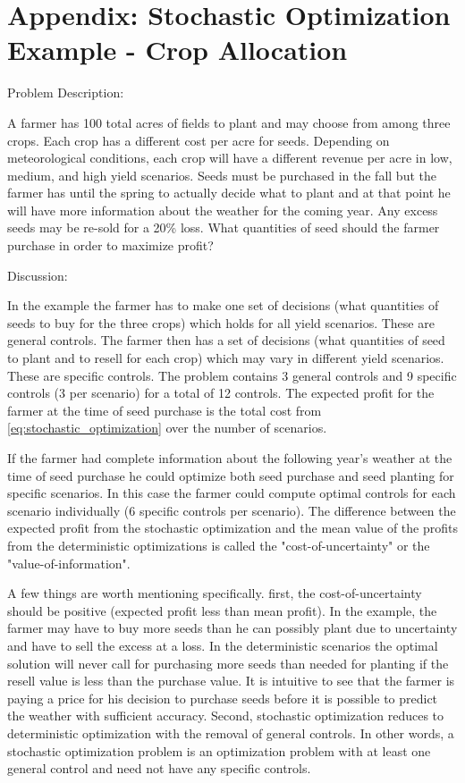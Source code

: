 \section{Appendix: Stochastic Optimization Example - Crop Allocation}

\noindent Problem Description:

\medskip

A farmer has 100 total acres of fields to plant and may choose from among three crops. Each crop has a different cost per acre for seeds. Depending on meteorological conditions, each crop will have a different revenue per acre in  low, medium, and high yield scenarios. Seeds must be purchased in the fall but the farmer has until the spring to actually decide what to plant and at that point he will have more information about the weather for the coming year. Any excess seeds may be re-sold for a 20\% loss. What quantities of seed should the farmer purchase in order to maximize profit?

\medskip

\noindent Discussion:

\medskip

In the example the farmer has to make one set of decisions (what quantities of seeds to buy for the three crops) which holds for all yield scenarios. These are general controls. The farmer then has a set of decisions (what quantities of seed to plant and to resell for each crop) which may vary in different yield scenarios. These are specific controls. The problem contains 3 general controls and 9 specific controls (3 per scenario) for a total of 12 controls. The expected profit for the farmer at the time of seed purchase is the total cost from \eqref{eq:stochastic_optimization} over the number of scenarios.

If the farmer had complete information about the following year's weather at the time of seed purchase he could optimize both seed purchase and seed planting for specific scenarios. In this case the farmer could compute optimal controls for each scenario individually (6 specific controls per scenario). The difference between the expected profit from the stochastic optimization and the mean value of the profits from the deterministic optimizations is called the "cost-of-uncertainty" or the "value-of-information".

A few things are worth mentioning specifically. first, the cost-of-uncertainty should be positive (expected profit less than mean profit). In the example, the farmer may have to buy more seeds than he can possibly plant due to uncertainty and have to sell the excess at a loss. In the deterministic scenarios the optimal solution will never call for purchasing more seeds than needed for planting if the resell value is less than the purchase value. It is intuitive to see that the farmer is paying a price for his decision to purchase seeds before it is possible to predict the weather with sufficient accuracy. Second, stochastic optimization reduces to deterministic optimization with the removal of general controls. In other words, a stochastic optimization problem is an optimization problem with at least one general control and need not have any specific controls.

